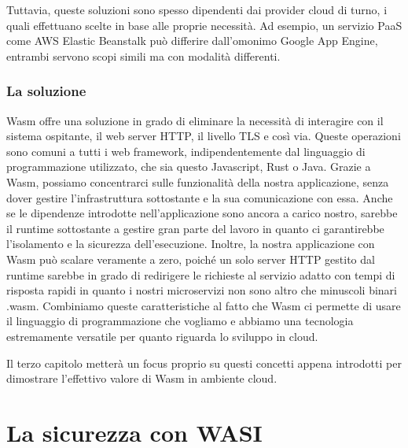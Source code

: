 Tuttavia, queste soluzioni sono spesso dipendenti dai provider cloud di turno, i quali effettuano scelte in base alle
proprie necessità. Ad esempio, un servizio PaaS come AWS Elastic Beanstalk può differire dall'omonimo Google App Engine,
entrambi servono scopi simili ma con modalità differenti.

\subsubsection{La soluzione}
Wasm offre una soluzione in grado di eliminare la necessità di interagire con il sistema ospitante, il web server HTTP,
il livello TLS e così via. Queste operazioni sono comuni a tutti i web framework, indipendentemente dal linguaggio di
programmazione utilizzato, che sia questo Javascript, Rust o Java. Grazie a Wasm, possiamo concentrarci sulle
funzionalità della nostra applicazione, senza dover gestire l'infrastruttura sottostante e la sua comunicazione con
essa. Anche se le dipendenze introdotte nell'applicazione sono ancora a carico nostro, sarebbe il runtime sottostante a
gestire gran parte del lavoro in quanto ci garantirebbe l'isolamento e la sicurezza dell'esecuzione. Inoltre, la nostra
applicazione con Wasm può scalare veramente a zero, poiché un solo server HTTP gestito dal runtime sarebbe in grado di
redirigere le richieste al servizio adatto con tempi di risposta rapidi in quanto i nostri microservizi non sono altro
che minuscoli binari .wasm. Combiniamo queste caratteristiche al fatto che Wasm ci permette di usare il linguaggio di
programmazione che vogliamo e abbiamo una tecnologia estremamente versatile per quanto riguarda lo sviluppo in cloud.

Il terzo capitolo metterà un focus proprio su questi concetti appena introdotti per dimostrare l'effettivo valore di
Wasm in ambiente cloud.

\section{La sicurezza con WASI}

